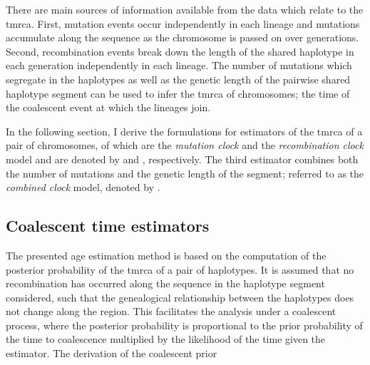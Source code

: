 There are  main sources of information available from the data which relate to the \gls{tmrca}.
First, mutation events occur independently in each lineage and mutations accumulate along the sequence as the chromosome is passed on over generations.
Second, recombination events break down the length of the shared haplotype in each generation independently in each lineage.
The number of mutations which segregate in the  haplotypes as well as the genetic length of the pairwise shared haplotype segment can be used to infer the \gls{tmrca} of  chromosomes; \ie the time of the coalescent event at which the  lineages join.

In the following section, I derive the formulations for  estimators of the \gls{tmrca} of a pair of chromosomes,  of which are the \emph{mutation clock} and the \emph{recombination clock} model and are denoted by \ClockM and \ClockR, respectively.
The third estimator combines both the number of mutations and the genetic length of the segment; referred to as the \emph{combined clock} model, denoted by \ClockC.


%
\subsection{Coalescent time estimators}
%


The presented age estimation method is based on the computation of the posterior probability of the \gls{tmrca} of a pair of haplotypes.
It is assumed that no recombination has occurred along the sequence in the haplotype segment considered, such that the genealogical relationship between the  haplotypes does not change along the region.
This facilitates the analysis under a coalescent process, where the posterior probability is proportional to the prior probability of the time to coalescence multiplied by the likelihood of the time given the estimator.
The derivation of the coalescent prior 


